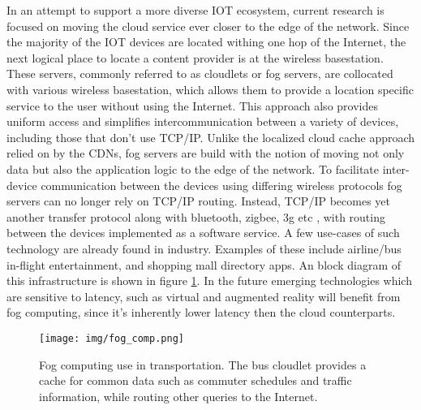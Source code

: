 In an attempt to support a more diverse IOT ecosystem, current research is focused on moving the cloud service ever closer to the edge of the network. Since the majority of the IOT devices are located withing one hop of the Internet, the next logical place to locate a content provider is at the wireless basestation.\cite{satyanarayanan2017emergence} These servers, commonly referred to as cloudlets or fog servers, are collocated with various wireless basestation, which allows them to provide a location specific service to the user without using the Internet. This approach also provides uniform access and simplifies intercommunication between a variety of devices, including those that don't use TCP/IP. Unlike the localized cloud cache approach relied on by the CDNs, fog servers are build with the notion of moving not only data but also the application logic to the edge of the network. To facilitate inter-device communication between the devices using differing wireless protocols fog servers can no longer rely on TCP/IP routing. Instead, TCP/IP becomes yet another transfer protocol along with bluetooth, zigbee, 3g etc , with routing between the devices implemented as a software service.\cite{edgeiot} A few use-cases of such technology are already found in industry. Examples of these include airline/bus in-flight entertainment, and shopping mall directory apps. An block diagram of this infrastructure is shown in figure \ref{lit:fig:3}. In the future emerging technologies which are sensitive to latency, such as virtual and augmented reality will benefit from fog computing, since it's inherently lower latency then the cloud counterparts.

\begin{figure}[h]
	\centering
	\texttt{[image: img/fog\_comp.png]}	
	\caption{Fog computing use in transportation. The bus cloudlet provides a cache for common data such as commuter schedules and traffic information, while routing other queries to the Internet.\cite{edgeiot}}
	\label{lit:fig:3}
\end{figure}


